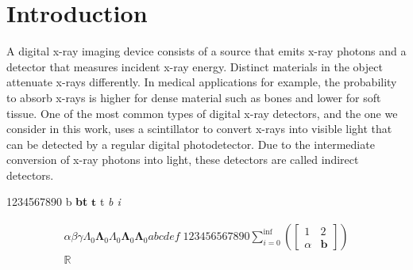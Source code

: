 \documentclass[DIV=10,BCOR=1cm,a4paper,parskip,headsepline,english,12pt]{scrbook}
\begin{document}
\frontmatter

\tableofcontents
\mainmatter
\chapter{Introduction}
A digital x-ray imaging device consists of a source that emits x-ray photons and a detector that measures incident x-ray energy. Distinct materials in the object attenuate x-rays differently. In medical applications for example, the probability to absorb x-rays is higher for dense material such as bones and lower for soft tissue.  One of the most common types of digital x-ray detectors, and the one we consider in this work, uses a scintillator to convert x-rays into visible light that can be detected by a regular digital photodetector. Due to the intermediate conversion of x-ray photons into light, these detectors are called indirect detectors. 


\begin{center}
 1234567890 b \textbf{bt} $\mathbf t$ t \textit{b i}
\end{center}

\begin{align}
 \alpha \beta \gamma \Lambda_0 \mathbf \Lambda_0 Λ_0 \boldsymbol Λ_0  \mathbf Λ_0 a b c d e f \; 123456567890 \sum_{i=0}^{\inf} \left( \begin{bmatrix}
                                                                     1 & 2 \\ \alpha & \mathbf b
                                                                    \end{bmatrix} \right)\\
\mathbb R
\end{align}
\end{document}
